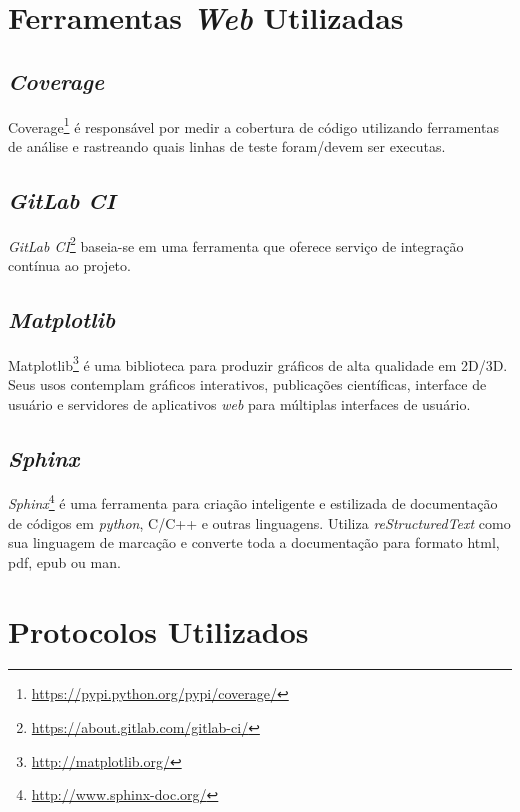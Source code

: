 \section{Ferramentas \textit{Web} Utilizadas}
    \subsection{\textit{Coverage}}
    Coverage\footnote{\url{https://pypi.python.org/pypi/coverage/}} é responsável por medir a cobertura de código utilizando ferramentas de análise e rastreando quais
    linhas de teste foram/devem ser executas.

    \subsection{\textit{GitLab CI}}
    \textit{GitLab CI}\footnote{\url{https://about.gitlab.com/gitlab-ci/}} baseia-se em uma ferramenta que oferece serviço de integração contínua ao projeto.

    \subsection{\textit{Matplotlib}}
    Matplotlib\footnote{\url{http://matplotlib.org/}} é uma biblioteca para produzir gráficos de alta qualidade em 2D/3D. Seus usos contemplam gráficos interativos, publicações científicas, interface de usuário e servidores de aplicativos \textit{web} para múltiplas interfaces de usuário.

    \subsection{\textit{Sphinx}}
    \textit{Sphinx}\footnote{\url{http://www.sphinx-doc.org/}} é uma ferramenta para criação inteligente e estilizada de documentação de códigos em \textit{python}, C/C++
    e outras linguagens. Utiliza \textit{reStructuredText} como sua linguagem de marcação e converte toda a documentação para formato html, pdf, epub ou man.

\section{Protocolos Utilizados}